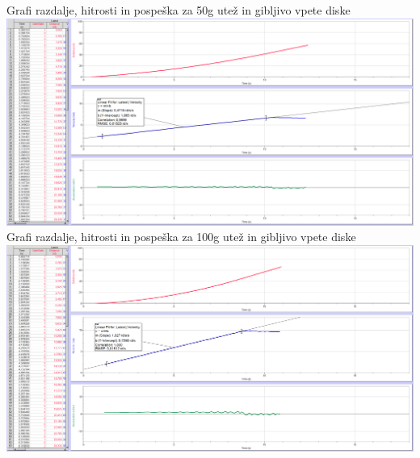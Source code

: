 \documentclass[a4paper]{report}
\begin{document}
\noindent Grafi razdalje, hitrosti in pospeška za 50g utež in gibljivo vpete diske\\
\includegraphics[width = \textwidth]{Gibljivo 50g}\\

\noindent Grafi razdalje, hitrosti in pospeška za 100g utež in gibljivo vpete diske\\
\includegraphics[width = \textwidth]{Gibljivo 100g}
\end{document}
